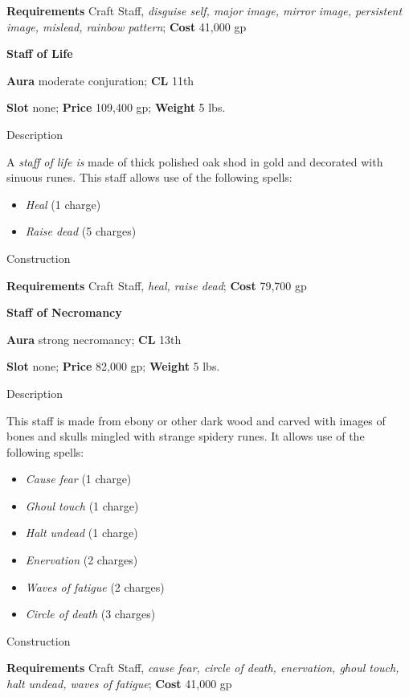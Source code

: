 \textbf{Requirements} Craft Staff, \textit{disguise self, major image, mirror image, persistent image, mislead, rainbow pattern}; \textbf{Cost }41,000 gp
				
\textbf{Staff of Life}
				
\textbf{Aura} moderate conjuration;\textbf{ CL }11th
				
\textbf{Slot} none; \textbf{Price} 109,400 gp; \textbf{Weight} 5 lbs.
				
Description
				
A \textit{staff of life is} made of thick polished oak shod in gold and decorated with sinuous runes. This staff allows use of the following spells:
				\begin{itemize}\item  \textit{Heal} (1 charge)
				\item  \textit{Raise dead} (5 charges) 
\end{itemize}
				
Construction
				
\textbf{Requirements} Craft Staff, \textit{heal, raise dead}; \textbf{Cost }79,700 gp
				
\textbf{Staff of Necromancy}
				
\textbf{Aura} strong necromancy; \textbf{CL} 13th
				
\textbf{Slot} none; \textbf{Price} 82,000 gp; \textbf{Weight} 5 lbs.
				
Description
				
This staff is made from ebony or other dark wood and carved with images of bones and skulls mingled with strange spidery runes. It allows use of the following spells:
				\begin{itemize}\item  \textit{Cause fear} (1 charge)
				\item  \textit{Ghoul touch} (1 charge)
				\item  \textit{Halt undead} (1 charge)
				\item  \textit{Enervation} (2 charges)
				\item  \textit{Waves of fatigue} (2 charges)
				\item  \textit{Circle of death} (3 charges) 
\end{itemize}
				
Construction
				
\textbf{Requirements} Craft Staff, \textit{cause fear, circle of death, enervation, ghoul touch, halt undead, waves of fatigue}; \textbf{Cost }41,000 gp
				
